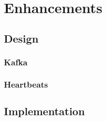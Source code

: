 \chapter{Enhancements}

\section{Design}

\subsection{Kafka}

\subsection{Heartbeats}

\section{Implementation}
